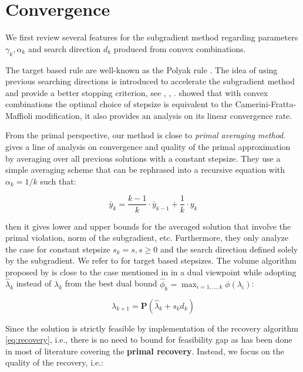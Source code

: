 \documentclass[../main]{subfiles}
\begin{document}
\section{Convergence}\label{convergence}


We first review several features for the subgradient method regarding
parameters \(\gamma_k, \alpha_k\) and search direction \(d_k\) produced from convex combinations.

The target based rule are well-known as the Polyak rule \cite{polyak_general_1967}.
The idea of using previous searching directions is introduced to accelerate the subgradient method and provide a better stopping criterion,
see \cite{camerini_improving_1975}, \cite{brannlund_generalized_1995}, \cite{barahona_volume_2000}.
\cite{brannlund_generalized_1995} showed that with convex combinations the optimal choice of stepsize is
equivalent to the Camerini-Fratta-Maffioli modification, it also provides an analysis on its linear convergence rate.

From the primal perspective, our method is close to \emph{primal
  averaging method}. \cite{nedic_approximate_2009}
gives a line of analysis on convergence and quality of the primal
approximation by averaging over all previous solutions with a constant
stepsize. They use a simple averaging scheme that can be rephrased into a
recursive equation with \(\alpha_k = 1/k\) such that:

\[\bar y_k = \frac{k-1}{k}\cdot\bar y_{k-1} + \frac{1}{k} \cdot y_k\]

then it gives lower and upper bounds for the averaged solution
that involve the primal violation, norm of the subgradient, etc. Furthermore, they only analyze the case for constant
stepsize \(s_k = s, s\ge 0\) and the search direction defined solely by
the subgradient. We refer to \cite{kiwiel_lagrangian_2007} for target based
stepsizes. The volume algorithm proposed by \cite{barahona_volume_2000} is close to the
case mentioned in \cite{brannlund_generalized_1995} in a dual
viewpoint while adopting \(\hat \lambda_{k}\) instead of \(\lambda_k\) from the best dual bound
\(\hat \phi_k = \max_{i=1, ..., k} \phi(\lambda_i)\):

\[\lambda_{k+1} = \mathbf{P}(\hat\lambda_{k} + s_{k}d_{k})\]

Since the solution is strictly feasible by implementation of the
recovery algorithm \eqref{eq:recovery}, i.e., there is no need to bound for feasibility gap
as has been done in most of literature covering the \textbf{primal
  recovery}. Instead, we focus on the quality of the recovery, i.e.:
\end{document}
